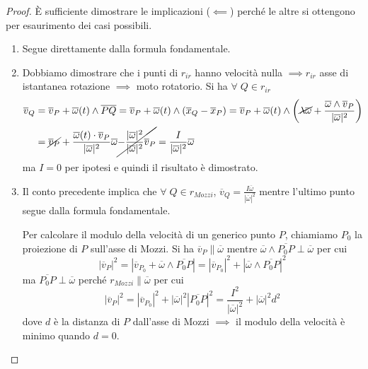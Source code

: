 \documentclass{book}
\theoremstyle{plain}
\theoremstyle{plain}
\theoremstyle{plain}
\theoremstyle{plain}
\theoremstyle{plain}
\theoremstyle{definition}
\theoremstyle{remark}
\theoremstyle{definition}
\begin{document}
\begin{proof}
    È sufficiente dimostrare le implicazioni ($\impliedby$) perché le altre si ottengono per esaurimento dei casi possibili.
    \begin{enumerate}
        \item Segue direttamente dalla formula fondamentale.
        \item Dobbiamo dimostrare che i punti di $r_{ir}$ hanno velocità nulla $\implies r_{ir}$ asse di istantanea rotazione $\implies$ moto rotatorio. Si ha $\forall \; Q \in r_{ir}$
        \[
        \begin{split}
            \overline{v}_Q&=\overline{v}_P+\overline{\omega}(t)\wedge\overline{PQ}=\overline{v}_P+\overline{\omega}(t)\wedge(\overline{x}_Q-\overline{x}_P)=\overline{v}_P+\overline{\omega}(t)\wedge\left(\cancel{\lambda\overline{\omega}}+\frac{\overline{\omega}\wedge\overline{v}_P}{|\overline{\omega}|^2}\right) \\
            &=\cancel{\overline{v}_P}+\frac{\overline{\omega}(t)\cdot\overline{v}_P}{|\overline{\omega}|^2}\overline{\omega}\cancel{-\frac{|\overline{\omega}|^2}{|\overline{\omega}|^2}\overline{v}_P}=\frac{I}{|\overline{\omega}|^2}\overline{\omega}
        \end{split}
        \]
        ma $I=0$ per ipotesi e quindi il risultato è dimostrato.
        \item Il conto precedente implica che $\forall\; Q \in r_{Mozzi}$, $\overline{v}_Q=\frac{I\overline{\omega}}{|\overline{\omega}|^2}$ mentre l'ultimo punto segue dalla formula fondamentale.

        \noindent Per calcolare il modulo della velocità di un generico punto $P$, chiamiamo $P_0$ la proiezione di $P$ sull'asse di Mozzi. Si ha $\overline{v}_P\parallel\overline{\omega}$ mentre $\overline{\omega}\wedge\overline{P_0P}\perp\overline{\omega}$ per cui
        \begin{displaymath}
            |\overline{v}_P|^2=|\overline{v}_{P_0}+\overline{\omega}\wedge\overline{P_0P}|=|\overline{v}_{P_0}|^2+|\overline{\omega}\wedge\overline{P_0P}|^2
        \end{displaymath}
        ma $\overline{P_0P}\perp\overline{\omega}$ perché $r_{Mozzi}\parallel\overline{\omega}$ per cui
        \begin{displaymath}
            |\overline{v}_P|^2=|\overline{v}_{P_0}|^2+|\overline{\omega}|^2|\overline{P_0P}|^2=\frac{I^2}{|\overline{\omega}|^2}+|\overline{\omega}|^2d^2
        \end{displaymath}
        dove $d$ è la distanza di $P$ dall'asse di Mozzi $\implies$ il modulo della velocità è minimo quando $d=0$.
    \end{enumerate}
\end{proof}
\end{document}
